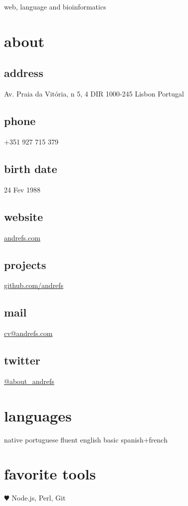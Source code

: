 \documentclass[a4paper]{friggeri-cv}
\begin{document}
       {web, language and bioinformatics}



\begin{aside}
  \section{about}
\begin{sensitive}
    \subsection{address}
    Av. Praia da Vitória,
    n 5, 4 DIR
    1000-245 Lisbon
    Portugal
    \subsection{phone}
    +351 927 715 379
    \subsection{birth date}
    24 Fev 1988
\end{sensitive}
    \subsection{website}
    \url{andrefs.com}
    \subsection{projects}
    \url{github.com/andrefs}
    \subsection{mail}
    \href{mailto:cv@andrefs.com}{cv@andrefs.com}
    \subsection{twitter}
    \href{http://witter.com/about_andrefs}{@about\_andrefs}
  \section{languages}
    native portuguese
    fluent english
    basic spanish+french
  \section{favorite tools}
    {$\varheartsuit$} Node.js, Perl, Git
\end{aside}
\end{document}
